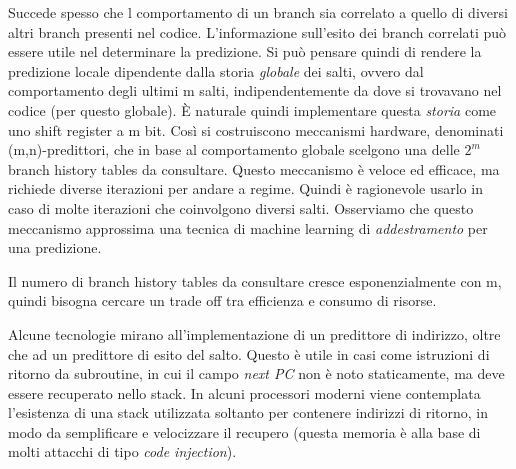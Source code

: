 \noindent Succede spesso che l comportamento di un branch sia correlato a quello di diversi altri branch presenti nel codice. L'informazione sull'esito dei branch correlati può essere utile nel determinare la predizione. Si può pensare quindi di rendere la predizione locale dipendente dalla storia \textit{globale} dei salti, ovvero dal comportamento degli ultimi m salti, indipendentemente da dove si trovavano nel codice (per questo globale). \uppercase{è} naturale quindi implementare questa \textit{storia} come uno shift register a m bit.  
Così si costruiscono meccanismi hardware, denominati (m,n)-predittori, che in base al comportamento globale scelgono una delle $2^m$ branch history tables da consultare. Questo meccanismo è veloce ed efficace, ma richiede diverse iterazioni per andare a regime. Quindi è ragionevole usarlo in caso di molte iterazioni che coinvolgono diversi salti. Osserviamo che questo meccanismo approssima una tecnica di machine learning di \textit{addestramento} per una predizione. 

\begin{warn}
    Il numero di branch history tables da consultare cresce esponenzialmente con m, quindi bisogna cercare un trade off tra efficienza e consumo di risorse.  
\end{warn}

\begin{figure}[ht]
    \centering
    \setlength{\fboxrule}{0.5pt} %
    \setlength{\fboxsep}{0pt}    %
\end{figure}

\noindent Alcune tecnologie mirano all'implementazione di un predittore di indirizzo, oltre che ad un predittore di esito del salto. Questo è utile in casi come istruzioni di ritorno da subroutine, in cui il campo \textit{next PC} non è noto staticamente, ma deve essere recuperato nello stack. In alcuni processori moderni viene contemplata l'esistenza di una stack utilizzata soltanto per contenere indirizzi di ritorno, in modo da semplificare e velocizzare il recupero (questa memoria è alla base di molti attacchi di tipo \textit{code injection}). 

